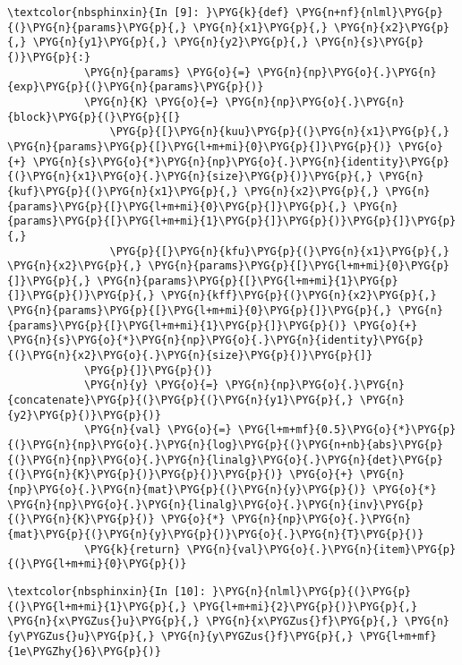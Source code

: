 \documentclass[letterpaper,10pt,english]{sphinxmanual}
\begin{document}
%
\begin{Verbatim}[commandchars=\\\{\}]
\textcolor{nbsphinxin}{In [9]: }\PYG{k}{def} \PYG{n+nf}{nlml}\PYG{p}{(}\PYG{n}{params}\PYG{p}{,} \PYG{n}{x1}\PYG{p}{,} \PYG{n}{x2}\PYG{p}{,} \PYG{n}{y1}\PYG{p}{,} \PYG{n}{y2}\PYG{p}{,} \PYG{n}{s}\PYG{p}{)}\PYG{p}{:}
            \PYG{n}{params} \PYG{o}{=} \PYG{n}{np}\PYG{o}{.}\PYG{n}{exp}\PYG{p}{(}\PYG{n}{params}\PYG{p}{)}
            \PYG{n}{K} \PYG{o}{=} \PYG{n}{np}\PYG{o}{.}\PYG{n}{block}\PYG{p}{(}\PYG{p}{[}
                \PYG{p}{[}\PYG{n}{kuu}\PYG{p}{(}\PYG{n}{x1}\PYG{p}{,} \PYG{n}{params}\PYG{p}{[}\PYG{l+m+mi}{0}\PYG{p}{]}\PYG{p}{)} \PYG{o}{+} \PYG{n}{s}\PYG{o}{*}\PYG{n}{np}\PYG{o}{.}\PYG{n}{identity}\PYG{p}{(}\PYG{n}{x1}\PYG{o}{.}\PYG{n}{size}\PYG{p}{)}\PYG{p}{,} \PYG{n}{kuf}\PYG{p}{(}\PYG{n}{x1}\PYG{p}{,} \PYG{n}{x2}\PYG{p}{,} \PYG{n}{params}\PYG{p}{[}\PYG{l+m+mi}{0}\PYG{p}{]}\PYG{p}{,} \PYG{n}{params}\PYG{p}{[}\PYG{l+m+mi}{1}\PYG{p}{]}\PYG{p}{)}\PYG{p}{]}\PYG{p}{,}
                \PYG{p}{[}\PYG{n}{kfu}\PYG{p}{(}\PYG{n}{x1}\PYG{p}{,} \PYG{n}{x2}\PYG{p}{,} \PYG{n}{params}\PYG{p}{[}\PYG{l+m+mi}{0}\PYG{p}{]}\PYG{p}{,} \PYG{n}{params}\PYG{p}{[}\PYG{l+m+mi}{1}\PYG{p}{]}\PYG{p}{)}\PYG{p}{,} \PYG{n}{kff}\PYG{p}{(}\PYG{n}{x2}\PYG{p}{,} \PYG{n}{params}\PYG{p}{[}\PYG{l+m+mi}{0}\PYG{p}{]}\PYG{p}{,} \PYG{n}{params}\PYG{p}{[}\PYG{l+m+mi}{1}\PYG{p}{]}\PYG{p}{)} \PYG{o}{+} \PYG{n}{s}\PYG{o}{*}\PYG{n}{np}\PYG{o}{.}\PYG{n}{identity}\PYG{p}{(}\PYG{n}{x2}\PYG{o}{.}\PYG{n}{size}\PYG{p}{)}\PYG{p}{]}
            \PYG{p}{]}\PYG{p}{)}
            \PYG{n}{y} \PYG{o}{=} \PYG{n}{np}\PYG{o}{.}\PYG{n}{concatenate}\PYG{p}{(}\PYG{p}{(}\PYG{n}{y1}\PYG{p}{,} \PYG{n}{y2}\PYG{p}{)}\PYG{p}{)}
            \PYG{n}{val} \PYG{o}{=} \PYG{l+m+mf}{0.5}\PYG{o}{*}\PYG{p}{(}\PYG{n}{np}\PYG{o}{.}\PYG{n}{log}\PYG{p}{(}\PYG{n+nb}{abs}\PYG{p}{(}\PYG{n}{np}\PYG{o}{.}\PYG{n}{linalg}\PYG{o}{.}\PYG{n}{det}\PYG{p}{(}\PYG{n}{K}\PYG{p}{)}\PYG{p}{)}\PYG{p}{)} \PYG{o}{+} \PYG{n}{np}\PYG{o}{.}\PYG{n}{mat}\PYG{p}{(}\PYG{n}{y}\PYG{p}{)} \PYG{o}{*} \PYG{n}{np}\PYG{o}{.}\PYG{n}{linalg}\PYG{o}{.}\PYG{n}{inv}\PYG{p}{(}\PYG{n}{K}\PYG{p}{)} \PYG{o}{*} \PYG{n}{np}\PYG{o}{.}\PYG{n}{mat}\PYG{p}{(}\PYG{n}{y}\PYG{p}{)}\PYG{o}{.}\PYG{n}{T}\PYG{p}{)}
            \PYG{k}{return} \PYG{n}{val}\PYG{o}{.}\PYG{n}{item}\PYG{p}{(}\PYG{l+m+mi}{0}\PYG{p}{)}
\end{Verbatim}

%
\begin{Verbatim}[commandchars=\\\{\}]
\textcolor{nbsphinxin}{In [10]: }\PYG{n}{nlml}\PYG{p}{(}\PYG{p}{(}\PYG{l+m+mi}{1}\PYG{p}{,} \PYG{l+m+mi}{2}\PYG{p}{)}\PYG{p}{,} \PYG{n}{x\PYGZus{}u}\PYG{p}{,} \PYG{n}{x\PYGZus{}f}\PYG{p}{,} \PYG{n}{y\PYGZus{}u}\PYG{p}{,} \PYG{n}{y\PYGZus{}f}\PYG{p}{,} \PYG{l+m+mf}{1e\PYGZhy{}6}\PYG{p}{)}
\end{Verbatim}
\end{document}
